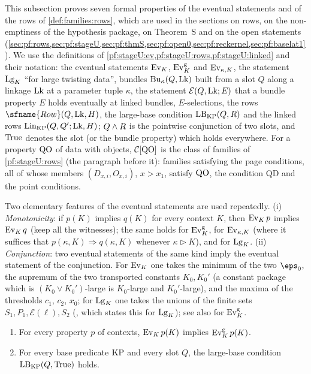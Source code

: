This subsection proves seven formal properties of the eventual statements and of the rows of
\cref{def:families:rows}, which are used in the sections on rows, on the non-emptiness of the hypothesis package, on
Theorem~S and on the open statements (\cref{sec:pf:rows,sec:pf:stageU,sec:pf:thmS,sec:pf:open0,sec:pf:reckernel,sec:pf:baselat1}).
We use the definitions of \cref{pf:stageU:ev,pf:stageU:rows,pf:stageU:linked} and their notation: the eventual
statements $\mathrm{Ev}_K$, $\mathrm{Ev}^{\mathrm g}_K$ and $\mathrm{Ev}_{\kappa,K}$, the statement $\mathrm{Lg}_K$ ``for large
twisting data'', bundles $\mathrm{Bu}_\kappa(Q,\mathrm{Lk})$ built from a slot $Q$ along a linkage $\mathrm{Lk}$ at a
parameter tuple $\kappa$, the statement $\mathcal{E}(Q,\mathrm{Lk};E)$ that a bundle property $E$ holds eventually at linked
bundles, $E$-selections, the rows $\sfname{Row}(Q,\shmiscLk,H)$, the large-base condition
$\mathrm{LB}_{\mathrm{KP}}(Q,R)$ and the linked rows $\mathrm{Lin}_{\mathrm{KP}}(Q,Q';\mathrm{Lk},H)$; $Q\mathbin{\wedge} R$ is the
pointwise conjunction of two slots, and $\mathrm{True}$ denotes the slot (or the bundle property) which holds everywhere.
For a property $\mathrm{QO}$ of data with objects, $\mathcal{C}[\mathrm{QO}]$ is the class of families of
\cref{pf:stageU:rows} (the paragraph before it): families satisfying the page conditions, all of whose members
$(D_{x,i},O_{x,i})$, $x>x_1$, satisfy $\mathrm{QO}$, the condition $\mathrm{QD}$ and the point conditions.

Two elementary features of the eventual statements are used repeatedly. (i) \emph{Monotonicity}: if $p(K)$ implies
$q(K)$ for every context $K$, then $\mathrm{Ev}_K\,p$ implies $\mathrm{Ev}_K\,q$ (keep all the witnesses); the same holds for
$\mathrm{Ev}^{\mathrm g}_K$, for $\mathrm{Ev}_{\kappa,K}$ (where it suffices that $p(\kappa,K)\Rightarrow q(\kappa,K)$ whenever
$\kappa\triangleright K$), and for $\mathrm{Lg}_K$. (ii) \emph{Conjunction}: two eventual statements of the same kind imply
the eventual statement of the conjunction. For $\mathrm{Ev}_K$ one takes the minimum of the two $\eps_0$, the supremum of the two
transported constants $K_0,K_0'$ (a constant package which is $(K_0\vee K_0')$-large is $K_0$-large and
$K_0'$-large), and the maxima of the thresholds $c_1$, $c_2$, $x_0$; for $\mathrm{Lg}_K$ one takes the unions of the
finite sets $S_1,P_1,\mathcal E(\ell),S_2$ (, which states this for
$\mathrm{Lg}_K$); see also  for $\mathrm{Ev}^{\mathrm g}_K$.

\begin{lemma}\label{pf:sh-misc:evtriv}
\begin{enumerate}[label=(\alph*)]
\item For every property $p$ of contexts, $\mathrm{Ev}_K\,p(K)$ implies $\mathrm{Ev}^{\mathrm g}_K\,p(K)$.
\item For every base predicate $\mathrm{KP}$ and every slot $Q$, the large-base condition $\mathrm{LB}_{\mathrm{KP}}(Q,\mathrm{True})$
holds.
\end{enumerate}
\end{lemma}

